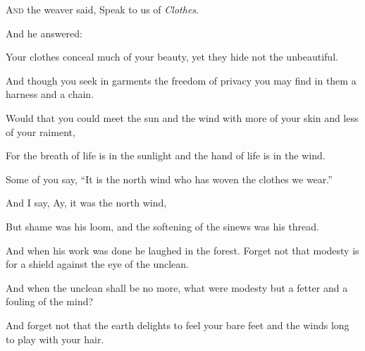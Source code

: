 
\lettrine{A}{nd} the weaver said, Speak to us of
\textit{Clothes}.

\bigskip
And he answered:

Your clothes conceal much of your
beauty, yet they hide not the
unbeautiful.

And though you seek in garments the
freedom of privacy you may find in them
a harness and a chain.

Would that you could meet the sun and
the wind with more of your skin and less
of your raiment,

For the breath of life is in the
sunlight and the hand of life is in the
wind.

Some of you say, \enquote{It is the north wind
who has woven the clothes we wear.}

And I say, Ay, it was the north wind,

But shame was his loom, and the
softening of the sinews was his thread.

And when his work was done he laughed in
the forest. Forget not that modesty
is for a shield against the eye of the
unclean.

And when the unclean shall be no more,
what were modesty but a fetter and a
fouling of the mind?

And forget not that the earth delights
to feel your bare feet and the winds
long to play with your hair.
